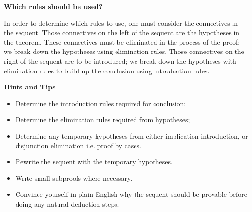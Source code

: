 \documentclass[11pt]{report}
\begin{document}
\textbf{Which rules should be used?}

In order to determine which rules to use, one must consider the connectives in the sequent. Those connectives on the left of the sequent are the hypotheses in the theorem. These connectives must be eliminated in the process of the proof; we break down the hypotheses using elimination rules. Those connectives on the right of the sequent are to be introduced; we break down the hypotheses with elimination rules to build up the conclusion using introduction rules. 

\textbf{Hints and Tips}

\begin{itemize}
	\item[] Determine the introduction rules required for conclusion; 
	\item[] Determine the elimination rules required from hypotheses;
	\item[] Determine any temporary hypotheses from either implication introduction, or disjunction elimination i.e. proof by cases. 
	\item[] Rewrite the sequent with the temporary hypotheses. 
	\item[] Write small subproofs where necessary. 
	\item[] Convince yourself in plain English why the sequent should be provable before doing any natural deduction steps.
\end{itemize}
\end{document}
